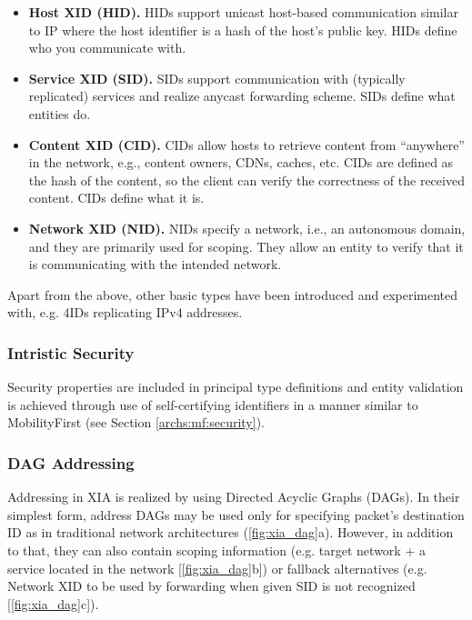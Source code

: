                 \begin{itemize}
                    \item \textbf{Host XID (HID).} HIDs support unicast host-based communication similar to IP where the host identifier is a hash of the host’s public key. HIDs define who you communicate with.
                    \item \textbf{Service XID (SID).} SIDs support communication with (typically replicated) services and realize anycast forwarding scheme. SIDs define what entities do.
                    \item \textbf{Content XID (CID).} CIDs allow hosts to retrieve content from ``anywhere'' in the network, e.g., content owners, CDNs, caches, etc. CIDs are defined as the hash of the content, so the client can verify the correctness of the received content. CIDs define what it is.
                    \item \textbf{Network XID (NID).} NIDs specify a network, i.e., an autonomous domain, and they are primarily used for scoping. They allow an entity to verify that it is communicating with the intended network.
                \end{itemize}

                Apart from the above, other basic types have been introduced and experimented with, e.g. 4IDs replicating IPv4 addresses.

            \subsubsection{Intristic Security}

                Security properties are included in principal type definitions and entity validation is achieved through use of self-certifying identifiers in a manner similar to MobilityFirst (see Section \ref{archs:mf:security}).

            \subsubsection{DAG Addressing}

                Addressing in XIA is realized by using Directed Acyclic Graphs (DAGs). In their simplest form, address DAGs may be used only for specifying packet's destination ID as in traditional network architectures (\ref{fig:xia_dag}a). However, in addition to that, they can also contain scoping information (e.g. target network + a service located in the network [\ref{fig:xia_dag}b]) or fallback alternatives (e.g. Network XID to be used by forwarding when given SID is not recognized [\ref{fig:xia_dag}c]).

